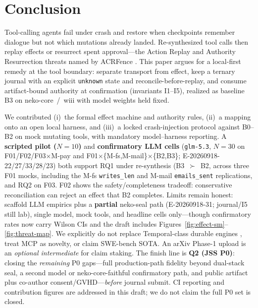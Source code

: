 \documentclass[11pt,a4paper]{article}
\begin{document}
\section{Conclusion}
\label{sec:conclusion}

Tool-calling agents fail under crash and restore when checkpoints remember
dialogue but not which mutations already landed. Re-synthesized tool calls
then replay effects or resurrect spent approval---the Action Replay and
Authority Resurrection threats named by ACRFence \cite{acrfence2026}. This
paper argues for a local-first remedy at the tool boundary: separate
transport from effect, keep a ternary journal with an explicit
\texttt{unknown} state and reconcile-before-replay, and consume
artifact-bound authority at confirmation (invariants I1--I5), realized as
baseline B3 on neko-core~/~wiii with model weights held fixed.

We contributed (i)~the formal effect machine and authority rules,
(ii)~a mapping onto an open local harness, and (iii)~a locked
crash-injection protocol against B0--B2 on mock mutating tools, with
mandatory model--harness reporting. A \textbf{scripted pilot ($N{=}10$)}
and \textbf{confirmatory LLM cells} (\texttt{glm-5.3}, $N{=}30$ on
F01/F02/F03$\times$M-pay and F01$\times$\{M-fs,M-mail\}$\times$\{B2,B3\};
E-20260918-22/27/33/28/23) both support RQ1 under re-synthesis (B3~$\succ$~B2,
across three F01 mocks, including the M-fs \texttt{writes\_len} and M-mail
\texttt{emails\_sent} replications, and RQ2 on F03. F02
shows the safety/completeness tradeoff: conservative reconciliation can
reject an effect that B2 completes. Limits remain honest: scaffold LLM empirics plus a
\textbf{partial} neko-seal path (E-20260918-31; journal/I5 still lab),
single model, mock tools, and headline cells only---though confirmatory
rates now carry Wilson CIs and the draft includes
Figures~\ref{fig:effect-sm}--\ref{fig:threat-map}. We explicitly do not
replace Temporal-class durable engines \cite{temporal2026agentharness},
treat MCP as novelty, or claim SWE-bench SOTA. An arXiv Phase-1 upload is
an \emph{optional intermediate} for claim staking. The finish line is
\textbf{Q2 (JSS P0)}: closing the \emph{remaining} P0 gaps---full
production-path fidelity beyond dual-stack seal, a second model or
neko-core-faithful confirmatory path, and public artifact plus co-author
consent/GVHD---\emph{before} journal submit.
CI reporting and contribution figures are addressed in this draft; we do
not claim the full P0 set is closed.
\end{document}
